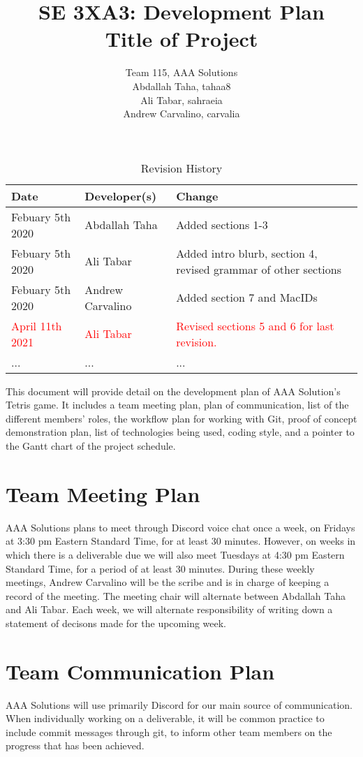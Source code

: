 \documentclass{article}
\title{SE 3XA3: Development Plan\\Title of Project}
\author{Team 115, AAA Solutions
		\\ Abdallah Taha, tahaa8
		\\ Ali Tabar, sahraeia
		\\ Andrew Carvalino, carvalia
}
\date{}
\begin{document}
\begin{table}[hp]
\caption{Revision History} \label{TblRevisionHistory}
\begin{tabularx}{\textwidth}{llX}
\toprule
\textbf{Date} & \textbf{Developer(s)} & \textbf{Change} \\
\midrule
Febuary 5th 2020 & Abdallah Taha & Added sections 1-3 \\
Febuary 5th 2020 & Ali Tabar & Added intro blurb, section 4, revised grammar of other sections \\
Febuary 5th 2020 & Andrew Carvalino & Added section 7 and MacIDs \\
\textcolor{red}{April 11th 2021} & \textcolor{red}{Ali Tabar} & \textcolor{red}{Revised sections 5 and 6 for last revision.}\\
... & ... & ...\\
\bottomrule
\end{tabularx}
\end{table}

\newpage

\maketitle

This document will provide detail on the development plan of AAA Solution's Tetris game. It includes a team meeting plan, plan of communication, list of the different members' roles, the workflow plan for working with Git, proof of concept demonstration plan, list of technologies being used, coding style, and a pointer to the Gantt chart of the project schedule.

\section{Team Meeting Plan}
AAA Solutions plans to meet through Discord voice chat once a week, on Fridays at 3:30 pm Eastern Standard Time, for at least 30 minutes. However, on weeks in which there is a deliverable due we will also meet Tuesdays at 4:30 pm Eastern Standard Time, for a period of at least 30 minutes. During these weekly meetings, Andrew Carvalino will be the scribe and is in charge of keeping a record of the meeting. The meeting chair will alternate between Abdallah Taha and Ali Tabar. Each week, we will alternate responsibility of writing down a statement of decisons made for the upcoming week. 

\section{Team Communication Plan}
AAA Solutions will use primarily Discord for our main source of communication. When individually working on a deliverable, it will be common practice to include commit messages through git, to inform other team members on the progress that has been achieved. 
\end{document}
